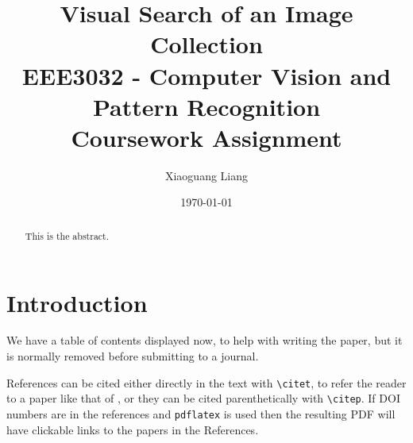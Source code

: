 \documentclass[11pt]{article}
\begin{document}
\title{%
  Visual Search of an Image Collection \\
  \large EEE3032 - Computer Vision and Pattern Recognition \\
  Coursework Assignment}

\author{Xiaoguang Liang}
\date{\today}


\suppressfloats

\tableofcontents

\begin{abstract}
This is the abstract.
\end{abstract}


\section{Introduction}

We have a table of contents displayed now, to help with writing the
paper, but it is normally removed before submitting to a journal.

References can be cited either directly in the text with
\verb+\citet+, to refer the reader to a paper like that of
\citet{Giles2003}, or they can be cited parenthetically
\citep{Adams2002} with \verb+\citep+. If DOI numbers are in the
references and \verb+pdflatex+ is used then the resulting PDF will
have clickable links to the papers in the References.
\end{document}
